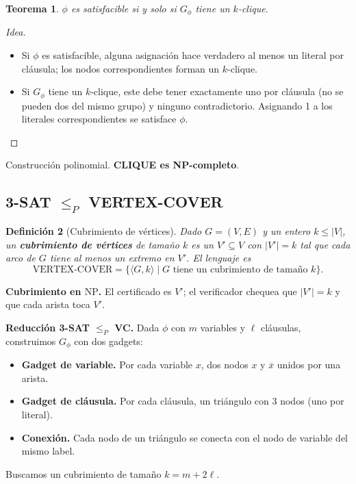 \documentclass[11pt,a4paper]{article}
\theoremstyle{definicion}
\newtheorem{definicion}{Definici\'on}[section]
\newtheorem{teorema}[definicion]{Teorema}
\newcommand{\enc}[1]{\langle #1 \rangle}
\newcommand{\redP}{\leq_{P}}
\newcommand{\NP}{\mathrm{NP}}
\begin{document}
\begin{teorema}
$\phi$ es satisfacible si y solo si $G_\phi$ tiene un $k$-clique.
\end{teorema}

\begin{proof}[Idea]
\begin{itemize}
    \item Si $\phi$ es satisfacible, alguna asignaci\'on hace verdadero al menos un literal por cl\'ausula; los nodos correspondientes forman un $k$-clique.
    \item Si $G_\phi$ tiene un $k$-clique, este debe tener exactamente uno por cl\'ausula (no se pueden dos del mismo grupo) y ninguno contradictorio. Asignando 1 a los literales correspondientes se satisface $\phi$.
\end{itemize}
\end{proof}

Construcci\'on polinomial. \textbf{CLIQUE es NP-completo}.

\subsection{3-SAT $\redP$ VERTEX-COVER}

\begin{definicion}[Cubrimiento de v\'ertices]
Dado $G = (V, E)$ y un entero $k \leq |V|$, un \textbf{cubrimiento de v\'ertices} de tama\~no $k$ es un $V' \subseteq V$ con $|V'| = k$ tal que cada arco de $G$ tiene al menos un extremo en $V'$. El lenguaje es
\[
\mathrm{VERTEX\text{-}COVER} = \{ \enc{G, k} \mid G \text{ tiene un cubrimiento de tama\~no } k\}.
\]
\end{definicion}

\textbf{Cubrimiento en $\NP$.} El certificado es $V'$; el verificador chequea que $|V'| = k$ y que cada arista toca $V'$.

\textbf{Reducci\'on 3-SAT $\redP$ VC.} Dada $\phi$ con $m$ variables y $\ell$ cl\'ausulas, construimos $G_\phi$ con dos gadgets:
\begin{itemize}
    \item \textbf{Gadget de variable.} Por cada variable $x$, dos nodos $x$ y $\overline{x}$ unidos por una arista.
    \item \textbf{Gadget de cl\'ausula.} Por cada cl\'ausula, un tri\'angulo con 3 nodos (uno por literal).
    \item \textbf{Conexi\'on.} Cada nodo de un tri\'angulo se conecta con el nodo de variable del mismo label.
\end{itemize}
Buscamos un cubrimiento de tama\~no $k = m + 2\ell$.
\end{document}

